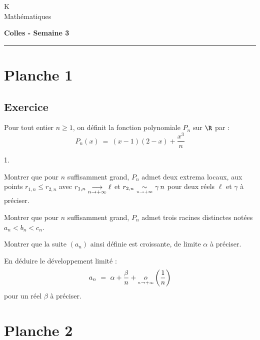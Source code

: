 \documentclass[11pt]{article}%
\begin{document}
\begin{flushleft}
K \\
Mathématiques
\end{flushleft}

\begin{center}
\textbf{\Large{Colles - Semaine 3}}
\end{center}

\hrule

\vspace*{0,2cm}

\section*{Planche 1}



\subsection*{Exercice} %

\noindent
Pour tout entier $n\geq 1$, on définit la fonction polynomiale $P_n$ 
sur $\R$ par :
\[
 P_n(x) \ = \ (x-1)(2-x) + \dfrac{x^3}{n}
\]
\begin{noliste}{1.}
 \item Montrer que pour $n$ suffisamment grand, $P_n$ admet deux 
 extrema locaux, aux points $r_{1,n} \leq r_{2,n}$ avec $r_{1,n} 
 \underset{n\to +\infty}{\longrightarrow} \ell$ et $r_{2,n} {\ \underset {{\overset {n \to +\infty}{}}}{\sim}\ } \gamma \, n$ pour deux réels $\ell$
 et $\gamma$ à préciser.
 
 \item Montrer que pour $n$ suffisamment grand, $P_n$ admet trois 
 racines distinctes notées $a_n < b_n < c_n$.
 
 \item Montrer que la suite $(a_n)$ ainsi définie est croissante, 
 de limite $\alpha$ à préciser.
 
 \item En déduire le développement limité :
 \[
  a_n \ = \ \alpha + \dfrac{\beta}{n} + {\underset {{\overset {n\rightarrow +\infty}{}}}{o}} \left(\dfrac{1}{n}
  \right)
 \]
 pour un réel $\beta$ à préciser.
\end{noliste}






\newpage



\section*{Planche 2}
\end{document}
